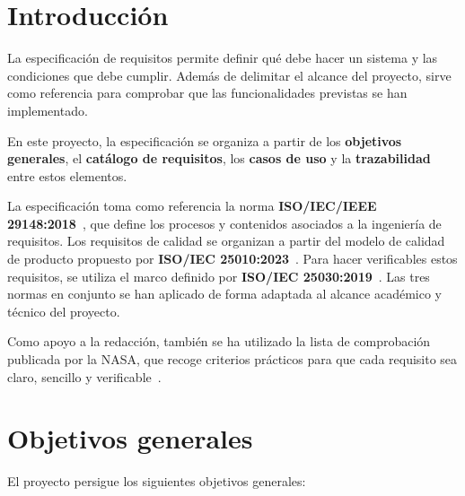 \section{Introducción}

La especificación de requisitos permite definir qué debe hacer un sistema y las
condiciones que debe cumplir. Además de delimitar el alcance del proyecto, sirve
como referencia para comprobar que las funcionalidades previstas se han
implementado.

En este proyecto, la especificación se organiza a partir de los
\textbf{objetivos generales}, el \textbf{catálogo de requisitos}, los
\textbf{casos de uso} y la \textbf{trazabilidad} entre estos elementos.

La especificación toma como referencia la norma
\textbf{\acs{ISO}/\acs{IEC}/\acs{IEEE}
29148:2018}~\cite{iso_29148_2018}, que define los procesos y contenidos asociados
a la ingeniería de requisitos. Los requisitos de calidad se organizan a partir
del modelo de calidad de producto propuesto por \textbf{\acs{ISO}/\acs{IEC}
25010:2023}~\cite{iso_25010_2023}. Para hacer verificables estos requisitos, se
utiliza el marco definido por \textbf{\acs{ISO}/\acs{IEC}
25030:2019}~\cite{iso_25030_2019}. Las tres normas en conjunto se han aplicado
de forma adaptada al alcance académico y técnico del proyecto.

Como apoyo a la redacción, también se ha utilizado la lista de comprobación
publicada por la NASA, que recoge criterios prácticos para que cada requisito
sea claro, sencillo y verificable~\cite{nasa_good_requirement}.

\newcommand{\idObjetivo}[1]{%
    \hypertarget{obj:#1}{#1}%
}

\newcommand{\refObjetivo}[1]{%
    \hyperlink{obj:#1}{#1}%
}

\section{Objetivos generales}

El proyecto persigue los siguientes objetivos generales:

